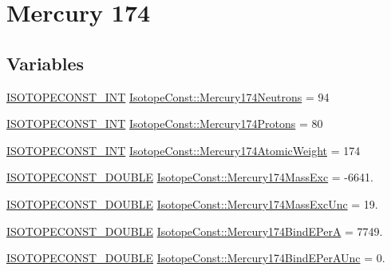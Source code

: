 \hypertarget{group___isotope_const-_mercury-_hg174}{}\section{Mercury 174}
\label{group___isotope_const-_mercury-_hg174}
\subsection*{Variables}
\begin{DoxyCompactItemize}
\item 
\mbox{\hyperlink{group___isotope_const-_macros_ga5f18360b3e99483a35c32d789e62621c}{I\+S\+O\+T\+O\+P\+E\+C\+O\+N\+S\+T\+\_\+\+I\+NT}} \mbox{\hyperlink{group___isotope_const-_mercury-_hg174_ga6d41d3ab1c57ec956ca01605f238b6bd}{Isotope\+Const\+::\+Mercury174\+Neutrons}} = 94
\item 
\mbox{\hyperlink{group___isotope_const-_macros_ga5f18360b3e99483a35c32d789e62621c}{I\+S\+O\+T\+O\+P\+E\+C\+O\+N\+S\+T\+\_\+\+I\+NT}} \mbox{\hyperlink{group___isotope_const-_mercury-_hg174_ga434cc9146871417912b8e33a23752b20}{Isotope\+Const\+::\+Mercury174\+Protons}} = 80
\item 
\mbox{\hyperlink{group___isotope_const-_macros_ga5f18360b3e99483a35c32d789e62621c}{I\+S\+O\+T\+O\+P\+E\+C\+O\+N\+S\+T\+\_\+\+I\+NT}} \mbox{\hyperlink{group___isotope_const-_mercury-_hg174_gaf1a645f6dd54bf240a557d12cf45a0cf}{Isotope\+Const\+::\+Mercury174\+Atomic\+Weight}} = 174
\item 
\mbox{\hyperlink{group___isotope_const-_macros_ga8f45a7272ce02c0b4c65c44636ed719a}{I\+S\+O\+T\+O\+P\+E\+C\+O\+N\+S\+T\+\_\+\+D\+O\+U\+B\+LE}} \mbox{\hyperlink{group___isotope_const-_mercury-_hg174_ga3ef7a095a725b151ec22c2e43d9a508b}{Isotope\+Const\+::\+Mercury174\+Mass\+Exc}} = -\/6641.
\item 
\mbox{\hyperlink{group___isotope_const-_macros_ga8f45a7272ce02c0b4c65c44636ed719a}{I\+S\+O\+T\+O\+P\+E\+C\+O\+N\+S\+T\+\_\+\+D\+O\+U\+B\+LE}} \mbox{\hyperlink{group___isotope_const-_mercury-_hg174_gac51affedd87390ff76383cedaee6a7ca}{Isotope\+Const\+::\+Mercury174\+Mass\+Exc\+Unc}} = 19.
\item 
\mbox{\hyperlink{group___isotope_const-_macros_ga8f45a7272ce02c0b4c65c44636ed719a}{I\+S\+O\+T\+O\+P\+E\+C\+O\+N\+S\+T\+\_\+\+D\+O\+U\+B\+LE}} \mbox{\hyperlink{group___isotope_const-_mercury-_hg174_ga1d42244ec4b1a5d85e8bda9214ecc3dc}{Isotope\+Const\+::\+Mercury174\+Bind\+E\+PerA}} = 7749.
\item 
\mbox{\hyperlink{group___isotope_const-_macros_ga8f45a7272ce02c0b4c65c44636ed719a}{I\+S\+O\+T\+O\+P\+E\+C\+O\+N\+S\+T\+\_\+\+D\+O\+U\+B\+LE}} \mbox{\hyperlink{group___isotope_const-_mercury-_hg174_ga07cf95ac00c9f1ee3354d31d79cfd8bc}{Isotope\+Const\+::\+Mercury174\+Bind\+E\+Per\+A\+Unc}} = 0.

\end{DoxyCompactItemize}
